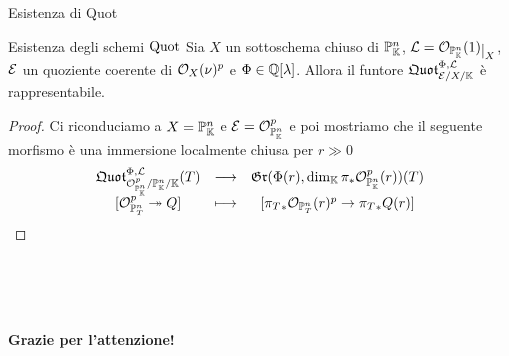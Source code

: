 \documentclass[a4paper]{beamer}
\begin{document}
\begin{frame}{Esistenza di Quot}
\begin{alertblock}{Esistenza degli schemi $\mathrm{Quot}$}
Sia $X$ un sottoschema chiuso di $\mathbb{P}^n_{\mathbb{K}}$, $\Lc=\Oc_{\Pj^n_\K}(1)\res X$, $\mathcal{E}$ un quoziente coerente di $\mathcal{O}_{X}(\nu)^p$ e $\Phi\in\mathbb{Q}[\lambda]$. Allora il funtore $\mathfrak{Quot}^{\Phi,\mathcal{L}}_{\mathcal{E}/X/\mathbb{K}}$ \`e rappresentabile. 
\end{alertblock}
\pause
\begin{proof}
Ci riconduciamo a $X=\mathbb{P}^n_{\mathbb{K}}$ e $\mathcal{E}=\mathcal{O}^p_{\mathbb{P}^n_{\mathbb{K}}}$ e poi mostriamo che il seguente morfismo \`e una immersione localmente chiusa per $r\gg0$
\[\begin{array}{ccc} {\mathfrak{Quot}^{\Phi,\mathcal{L}}_{\mathcal{O}^p_{\mathbb{P}^n_{\mathbb{K}}}/\mathbb{P}^n_{\mathbb{K}}/\mathbb{K}}(T)} & \longrightarrow & {\mathfrak{Gr}(\Phi(r),\dim_{\mathbb{K}}\pi_\ast\mathcal{O}^p_{\mathbb{P}^n_{\mathbb{K}}}(r))(T)}\\ {[\mathcal{O}^p_{\mathbb{P}^n_T}\twoheadrightarrow Q]} & \longmapsto & {[{\pi_T}_\ast\mathcal{O}_{\mathbb{P}^n_T}(r)^p\to {\pi_T}_\ast Q(r)]} \end{array}\]
\end{proof}
~\\~\\~
\end{frame}




\begin{frame}
\begin{center}
{\huge \textbf{Grazie per l'attenzione!}}
\end{center}
\end{frame}
\end{document}

